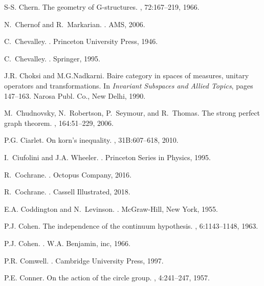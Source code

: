 \documentclass[12pt]{amsart}
\begin{document}
\begin{thebibliography}{100}
S-S. Chern.
\newblock The geometry of {G}-structures.
, 72:167--219, 1966.

N.~Chernof and R.~Markarian.
.
\newblock AMS, 2006.

C.~Chevalley.
.
\newblock Princeton University Press, 1946.

C.~Chevalley.
.
\newblock Springer, 1995.

J.R. Choksi and M.G.Nadkarni.
\newblock Baire category in spaces of measures, unitary operators and
  transformations.
\newblock In {\em Invariant Subspaces and Allied Topics}, pages 147--163.
  Narosa Publ. Co., New Delhi, 1990.

M.~Chudnovsky, N.~Robertson, P.~Seymour, and R.~Thomas.
\newblock The strong perfect graph theorem.
, 164:51--229, 2006.

P.G. Ciarlet.
\newblock On korn's inequality.
, 31B:607--618, 2010.

I.~Ciufolini and J.A. Wheeler.
.
\newblock Princeton Series in Physics, 1995.

R.~Cochrane.
.
\newblock Octopus Company, 2016.

R.~Cochrane.
.
\newblock Cassell Illustrated, 2018.

E.A. Coddington and N.~Levinson.
.
\newblock McGraw-Hill, New York, 1955.

P.J. Cohen.
\newblock The independence of the continuum hypothesis.
, 6:1143--1148, 1963.

P.J. Cohen.
.
\newblock W.A. Benjamin, inc, 1966.

P.R. Comwell.
.
\newblock Cambridge University Press, 1997.

P.E. Conner.
\newblock On the action of the circle group.
, 4:241--247, 1957.


\end{thebibliography}
\end{document}
